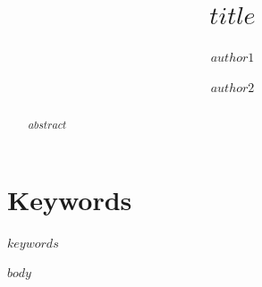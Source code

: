 \documentclass[10pt,a4paper]{article}
\begin{document}
\pagestyle{fancy}

\title{$title$}
\author[1]{$author1$}
\author[1]{$author2$}


\maketitle
\thispagestyle{fancy}

\begin{abstract}

$abstract$

\end{abstract}

\section*{\color{f1ROrange}Keywords}

$keywords$

\clearpage
\pagestyle{fancy}

$body$
\end{document}
